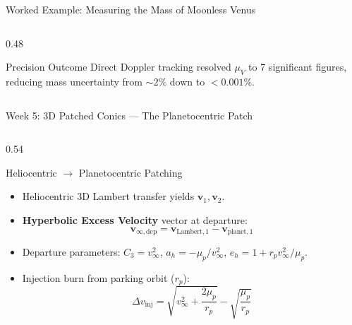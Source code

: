 \documentclass[aspectratio=169, 10pt]{beamer}
\begin{document}
\begin{frame}{Worked Example: Measuring the Mass of Moonless Venus}
\begin{columns}[t]
\begin{column}{0.48\textwidth}
            \vspace{-0.1cm}
            \begin{alertblock}{Precision Outcome}
                \scriptsize
                Direct Doppler tracking resolved $\mu_V$ to 7 significant figures, reducing mass uncertainty from $\sim 2\%$ down to $< 0.001\%$.
            \end{alertblock}
        \end{column}
    \end{columns}
\end{frame}

\begin{frame}{Week 5: 3D Patched Conics --- The Planetocentric Patch}
    \begin{columns}[t]
        \begin{column}{0.54\textwidth}
            \begin{block}{Heliocentric $\to$ Planetocentric Patching}
                \scriptsize
                \begin{itemize}\setlength{\itemsep}{1pt}
                    \item Heliocentric 3D Lambert transfer yields $\mathbf{v}_1, \mathbf{v}_2$.
                    \item \textbf{Hyperbolic Excess Velocity} vector at departure:
                    \vspace{-0.05cm}
                    \begin{equation*}
                        \mathbf{v}_{\infty,\text{dep}} = \mathbf{v}_{\text{Lambert},1} - \mathbf{v}_{\text{planet},1}
                    \end{equation*}
                    \vspace{-0.2cm}
                    \item Departure parameters: $C_3 = v_\infty^2$, $a_h = -\mu_p / v_\infty^2$, $e_h = 1 + r_p v_\infty^2 / \mu_p$.
                    \item Injection burn from parking orbit ($r_p$):
                    \vspace{-0.05cm}
                    \begin{equation*}
                        \Delta v_{\text{inj}} = \sqrt{v_\infty^2 + \frac{2\mu_p}{r_p}} - \sqrt{\frac{\mu_p}{r_p}}
                    \end{equation*}
                \end{itemize}
            \end{block}
        \end{column}


\end{columns}
\end{frame}
\end{document}
